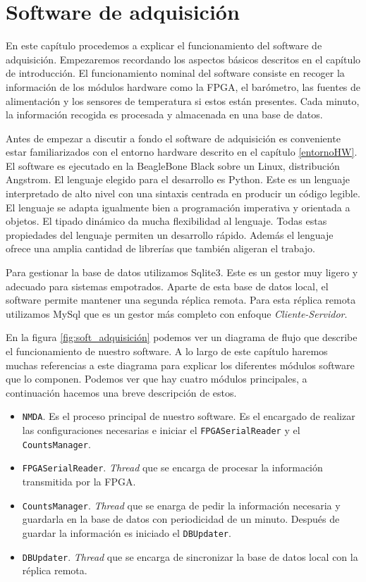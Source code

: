 \chapter{Software de adquisición}
\label{cap2}
En este capítulo procedemos a explicar el funcionamiento del software de adquisición. Empezaremos recordando los aspectos básicos descritos en el
capítulo de introducción. El funcionamiento nominal del software consiste en recoger la información de los módulos hardware como la FPGA, el
barómetro, las fuentes de alimentación y los sensores de temperatura si estos están presentes. Cada minuto, la información recogida es procesada y
almacenada en una base de datos. 
\par
Antes de empezar a discutir a fondo el software de adquisición es conveniente estar familiarizados con el entorno hardware descrito en el capítulo
\ref{entornoHW}. El software es ejecutado en la BeagleBone Black sobre un Linux, distribución Angstrom. El lenguaje elegido para el desarrollo es
Python\cite{Python}. Este  es un lenguaje interpretado de alto nivel con una sintaxis centrada en producir un código legible. El lenguaje se adapta
igualmente bien a programación imperativa y orientada a objetos. El tipado dinámico da mucha flexibilidad al lenguaje. Todas estas propiedades del
lenguaje permiten un desarrollo rápido. Además el lenguaje ofrece una amplia cantidad de librerías que también aligeran el trabajo. 
\par
Para gestionar la base de datos utilizamos Sqlite3\cite{Sqlite}. Este es un gestor muy ligero y adecuado para sistemas empotrados. Aparte de esta base
de datos local, el software permite mantener una segunda réplica remota. Para esta réplica remota utilizamos MySql\cite{MySql} que es un gestor más
completo con enfoque \emph{Cliente-Servidor}.
\par
En la figura \ref{fig:soft_adquisición} podemos ver un diagrama de flujo que describe el funcionamiento de nuestro software. A lo largo de este
capítulo haremos muchas referencias a este diagrama para explicar los diferentes módulos software que lo componen. Podemos ver que hay cuatro módulos
principales, a continuación hacemos una breve descripción de estos. 
\begin{itemize}
  	\item	\texttt{NMDA}. Es el proceso principal de nuestro software. Es el encargado de realizar las configuraciones necesarias e iniciar
	  	el \texttt{FPGASerialReader} y el \texttt{CountsManager}.
	\item	\texttt{FPGASerialReader}. \emph{Thread} que se encarga de procesar la información transmitida por la FPGA.
	\item	\texttt{CountsManager}. \emph{Thread} que se enarga de pedir la información necesaria y guardarla en la base de datos con periodicidad
	  	de un minuto. Después de guardar la información es iniciado el \texttt{DBUpdater}.
	\item	\texttt{DBUpdater}. \emph{Thread} que se encarga de sincronizar la base de datos local con la réplica remota.
\end{itemize}

